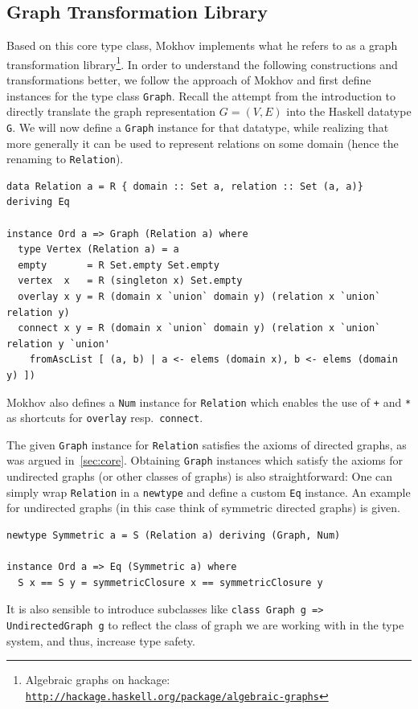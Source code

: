 \documentclass{article}
\newcommand{\hs}{\texttt}
\begin{document}
\subsection{Graph Transformation Library}\label{sec:trafo}
Based on this core type class, Mokhov implements what he refers to as a graph
transformation library\footnote{Algebraic graphs on hackage:
  \texttt{\href{http://hackage.haskell.org/package/algebraic-graphs}{http://hackage.haskell.org/package/algebraic-graphs}}}.
In order to understand the following constructions and transformations better,
we follow the approach of Mokhov and first define instances for the type class
\hs{Graph}. Recall the attempt from the introduction to directly translate the
graph representation $G=(V,E)$ into the Haskell datatype \hs{G}. We will now
define a \hs{Graph} instance for that datatype, while realizing that more
generally it can be used to represent relations on some domain (hence the renaming
to \hs{Relation}).
\begin{verbatim}
data Relation a = R { domain :: Set a, relation :: Set (a, a)} deriving Eq

instance Ord a => Graph (Relation a) where
  type Vertex (Relation a) = a
  empty       = R Set.empty Set.empty
  vertex  x   = R (singleton x) Set.empty
  overlay x y = R (domain x `union` domain y) (relation x `union` relation y)
  connect x y = R (domain x `union` domain y) (relation x `union` relation y `union'
    fromAscList [ (a, b) | a <- elems (domain x), b <- elems (domain y) ])
\end{verbatim}
Mokhov also defines a \hs{Num} instance for \hs{Relation} which enables the use
of \hs{+} and \hs{*} as shortcuts for \hs{overlay} resp.\ \hs{connect}.

The given \hs{Graph} instance for \hs{Relation} satisfies the axioms of directed
graphs, as was argued in~\autoref{sec:core}. Obtaining \hs{Graph} instances
which satisfy the axioms for undirected graphs (or other classes of graphs) is
also straightforward: One can simply wrap \hs{Relation} in a \hs{newtype} and
define a custom \hs{Eq} instance. An example for undirected graphs (in this case
think of symmetric directed graphs) is given.
\begin{verbatim}
newtype Symmetric a = S (Relation a) deriving (Graph, Num)

instance Ord a => Eq (Symmetric a) where
  S x == S y = symmetricClosure x == symmetricClosure y
\end{verbatim}
It is also sensible to introduce subclasses like \hs{class Graph g => UndirectedGraph g}
to reflect the class of graph we are working with in the type system, and thus,
increase type safety.
\end{document}
